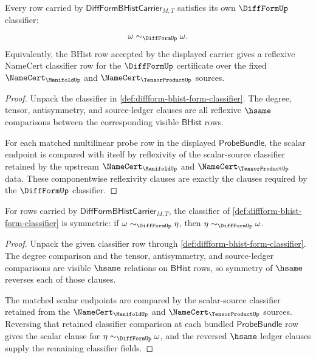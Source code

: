 \begin{theorem}
\label{thm:diffform-classifier-reflexivity-obligation}
Every row carried by $\mathsf{DiffFormBHistCarrier}_{M,T}$ satisfies its own
$\DiffFormUp$ classifier:
$$
\omega\sim_{\DiffFormUp}\omega.
$$
Equivalently, the BHist row accepted by the displayed carrier gives a
reflexive NameCert classifier row for the $\DiffFormUp$ certificate over the
fixed $\NameCert_{\ManifoldUp}$ and $\NameCert_{\TensorProductUp}$ sources.
\end{theorem}
\begin{proof}
Unpack the classifier in \autoref{def:diffform-bhist-form-classifier}. The
degree, tensor, antisymmetry, and source-ledger clauses are all reflexive
$\hsame$ comparisons between the corresponding visible $\mathsf{BHist}$ rows.

For each matched multilinear probe row in the displayed $\mathsf{ProbeBundle}$,
the scalar endpoint is compared with itself by reflexivity of the scalar-source
classifier retained by the upstream $\NameCert_{\ManifoldUp}$ and
$\NameCert_{\TensorProductUp}$ data. These componentwise reflexivity clauses
are exactly the clauses required by the $\DiffFormUp$ classifier.
\end{proof}

\begin{theorem}
\label{thm:diffform-classifier-symmetry-obligation}
For rows carried by $\mathsf{DiffFormBHistCarrier}_{M,T}$, the classifier of
\autoref{def:diffform-bhist-form-classifier} is symmetric: if
$\omega\sim_{\DiffFormUp}\eta$, then $\eta\sim_{\DiffFormUp}\omega$.
\end{theorem}
\begin{proof}
Unpack the given classifier row through
\autoref{def:diffform-bhist-form-classifier}. The degree comparison and the
tensor, antisymmetry, and source-ledger comparisons are visible $\hsame$
relations on $\mathsf{BHist}$ rows, so symmetry of $\hsame$ reverses each of
those clauses.

The matched scalar endpoints are compared by the scalar-source classifier
retained from the $\NameCert_{\ManifoldUp}$ and $\NameCert_{\TensorProductUp}$
sources. Reversing that retained classifier comparison at each bundled
$\mathsf{ProbeBundle}$ row gives the scalar clause for
$\eta\sim_{\DiffFormUp}\omega$, and the reversed $\hsame$ ledger clauses supply
the remaining classifier fields.
\end{proof}

